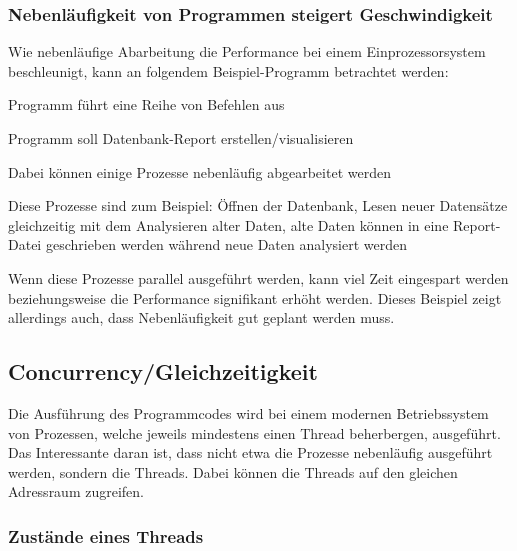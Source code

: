 \subsubsection{Nebenläufigkeit von Programmen steigert Geschwindigkeit}
Wie nebenläufige Abarbeitung die Performance bei einem Einprozessorsystem beschleunigt, kann an folgendem Beispiel-Programm betrachtet werden:
 
\begin{compactitem}
    \item Programm führt eine Reihe von Befehlen aus
    \item Programm soll Datenbank-Report erstellen/visualisieren    
    \item Dabei können einige Prozesse nebenläufig abgearbeitet werden
    \item Diese Prozesse sind zum Beispiel: Öffnen der Datenbank, Lesen neuer Datensätze gleichzeitig mit dem Analysieren alter Daten, alte Daten können in eine Report-Datei geschrieben werden während neue Daten analysiert werden
\end{compactitem}

Wenn diese Prozesse parallel ausgeführt werden, kann viel Zeit eingespart werden beziehungsweise die Performance signifikant erhöht werden. Dieses Beispiel zeigt allerdings auch, dass Nebenläufigkeit gut geplant werden muss.
\cite{javaInselBuch}
 
 
\subsection{Concurrency/Gleichzeitigkeit}
Die Ausführung des Programmcodes wird bei einem modernen Betriebssystem von Prozessen, welche jeweils mindestens einen Thread beherbergen, ausgeführt. Das Interessante daran ist, dass nicht etwa die Prozesse nebenläufig ausgeführt werden, sondern die Threads. Dabei können die Threads auf den gleichen Adressraum zugreifen. \cite{javaInselBuch}
 
\subsubsection{Zustände eines Threads}

